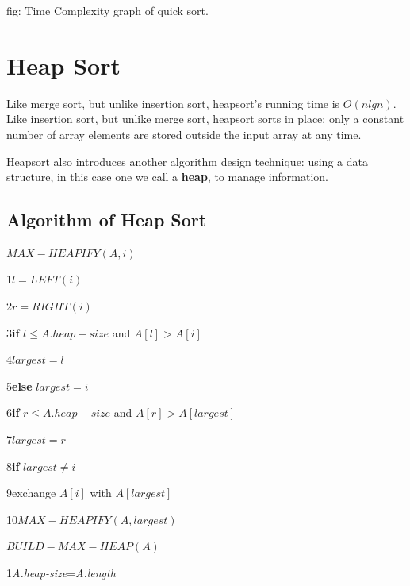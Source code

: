 \documentclass[12 pt,a4paper]{report}
\begin{document}
\hspace{5cm}fig: Time Complexity graph of quick sort.

\section{Heap Sort}

Like merge sort, but unlike insertion sort, heapsort's running time is $O(n lgn)$. Like insertion sort, but unlike merge sort, heapsort sorts in place: only a constant number of array elements are stored outside the input array at any time. 

Heapsort also introduces another algorithm design technique: using a data structure, in this case one we call a \textbf{heap}, to manage information. 

\subsection{Algorithm of Heap Sort}


$MAX-HEAPIFY(A,i)$

1\hspace{0.5cm}$l=LEFT(i)$

2\hspace{0.5cm}$r=RIGHT(i)$

3\hspace{0.5cm}\textbf{if} $l \leq A.heap-size$ and $A[l]>A[i]$

4\hspace{1cm}$largest=l$

5\hspace{0.5cm}\textbf{else} $largest=i$

6\hspace{0.5cm}\textbf{if} $r \leq A.heap-size$ and $A[r]>A[largest]$

7\hspace{1cm}$largest=r$

8\hspace{0.5cm}\textbf{if} $largest \neq i$

9\hspace{1cm}exchange $A[i]$ with $A[largest]$

10\hspace{1cm}$MAX-HEAPIFY(A,largest)$

\vspace{1cm}

$BUILD-MAX-HEAP(A)$

1\hspace{0.5cm}\textit{A.heap-size}=\textit{A.length}
\end{document}
